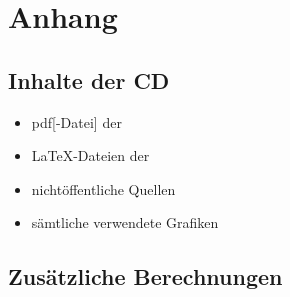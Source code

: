 \chapter{Anhang}
\label{Anhang}

\section{Inhalte der CD}
\label{CD}
    \begin{itemize}
        \item \ac{pdf}[-Datei] der \art
        \item \LaTeX-Dateien der \art
        \item nichtöffentliche Quellen
        \item sämtliche verwendete Grafiken
    \end{itemize}

    \section{Zusätzliche Berechnungen}
